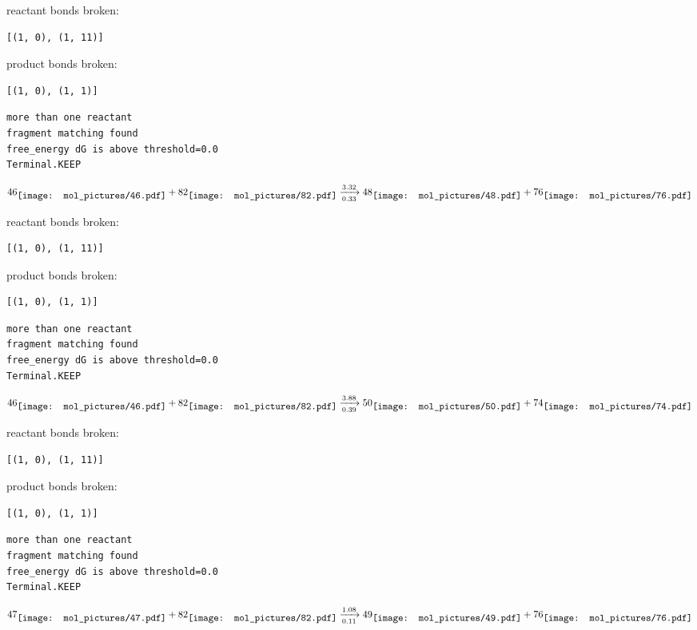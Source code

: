 \documentclass{article}
\begin{document}
reactant bonds broken:\begin{verbatim}
[(1, 0), (1, 11)]
\end{verbatim}
product bonds broken:\begin{verbatim}
[(1, 0), (1, 1)]
\end{verbatim}




\vspace{1cm}
\begin{verbatim}
more than one reactant
fragment matching found
free_energy dG is above threshold=0.0
Terminal.KEEP
\end{verbatim}
$$
46
\raisebox{-.5\height}{\texttt{[image: mol\_pictures/46.pdf]}}
+
82
\raisebox{-.5\height}{\texttt{[image: mol\_pictures/82.pdf]}}
\xrightarrow[0.33]{3.32}
48
\raisebox{-.5\height}{\texttt{[image: mol\_pictures/48.pdf]}}
+
76
\raisebox{-.5\height}{\texttt{[image: mol\_pictures/76.pdf]}}
$$


reactant bonds broken:\begin{verbatim}
[(1, 0), (1, 11)]
\end{verbatim}
product bonds broken:\begin{verbatim}
[(1, 0), (1, 1)]
\end{verbatim}




\vspace{1cm}
\begin{verbatim}
more than one reactant
fragment matching found
free_energy dG is above threshold=0.0
Terminal.KEEP
\end{verbatim}
$$
46
\raisebox{-.5\height}{\texttt{[image: mol\_pictures/46.pdf]}}
+
82
\raisebox{-.5\height}{\texttt{[image: mol\_pictures/82.pdf]}}
\xrightarrow[0.39]{3.88}
50
\raisebox{-.5\height}{\texttt{[image: mol\_pictures/50.pdf]}}
+
74
\raisebox{-.5\height}{\texttt{[image: mol\_pictures/74.pdf]}}
$$


reactant bonds broken:\begin{verbatim}
[(1, 0), (1, 11)]
\end{verbatim}
product bonds broken:\begin{verbatim}
[(1, 0), (1, 1)]
\end{verbatim}




\vspace{1cm}
\begin{verbatim}
more than one reactant
fragment matching found
free_energy dG is above threshold=0.0
Terminal.KEEP
\end{verbatim}
$$
47
\raisebox{-.5\height}{\texttt{[image: mol\_pictures/47.pdf]}}
+
82
\raisebox{-.5\height}{\texttt{[image: mol\_pictures/82.pdf]}}
\xrightarrow[0.11]{1.08}
49
\raisebox{-.5\height}{\texttt{[image: mol\_pictures/49.pdf]}}
+
76
\raisebox{-.5\height}{\texttt{[image: mol\_pictures/76.pdf]}}
$$
\end{document}
